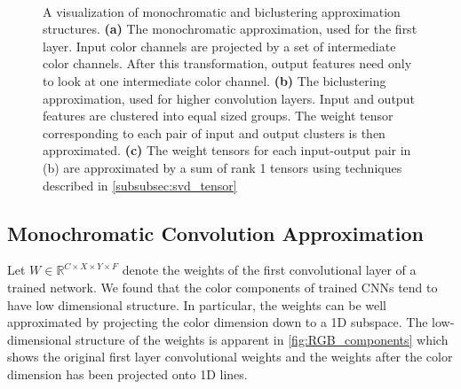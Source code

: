 \begin{figure}[ht]
\centering
\mbox{
\hspace{1mm}
\hspace{1mm}
}
\vspace{-3mm}
\caption{ A visualization of monochromatic and biclustering approximation structures. {\bf (a)} The monochromatic approximation, used for the first layer. Input color channels are projected by a set of intermediate color channels. After this transformation, output features need only to look at one intermediate color channel. {\bf (b)} The biclustering approximation, used for higher convolution layers. Input and output features are clustered into equal sized groups. The weight tensor corresponding to each pair of input and output clusters is then approximated. {\bf (c)} The weight tensors for each input-output pair in (b) are approximated by a sum of rank 1 tensors using techniques described in \ref{subsubsec:svd_tensor}}
\end{figure}

\subsection{Monochromatic Convolution Approximation}\label{subsec:monochromatic}
Let $W \in \mathbb{R}^{C \times X \times Y \times F}$ denote the
weights of the first convolutional layer of a trained network.  
We found that the color components
 of trained CNNs tend to have low dimensional structure. In
particular, the weights can be well approximated by projecting the
color dimension down to a 1D subspace.
The low-dimensional structure of the weights is apparent in
\ref{fig:RGB_components} which shows the original first layer convolutional weights
and the weights after the color dimension has
been projected onto 1D lines.

